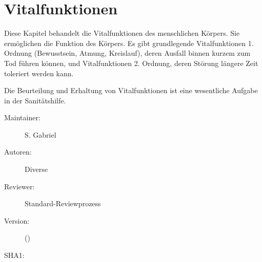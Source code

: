 % 
\def\ChapterCode{VIT}
\chapter
[\CO{[VIT]} Vitalfunktionen]
{Vitalfunktionen}
\label{chp:VIT}



% 
% 

\ChapterIntro
{Diese Kapitel behandelt die Vitalfunktionen
des menschlichen Körpers. Sie ermöglichen die Funktion des
Körpers. Es gibt grundlegende Vitalfunktionen 1. Ordnung
(Bewusstsein, Atmung, Kreislauf), deren Ausfall binnen
kurzem zum Tod führen können, und Vitalfunktionen 2.
Ordnung, deren
Störung längere Zeit toleriert werden kann.

Die Beurteilung und Erhaltung von Vitalfunktionen ist eine
wesentliche Aufgabe in der Sanitätshilfe.
}{%
\begin{description}
  \item[Maintainer:] S. Gabriel
  \item[Autoren:] Diverse
  \item[Reviewer:] Standard-Reviewprozess
  \item[Version:] {\DocVersion} ({\DocVersionInfo})
  \item[SHA1:] {\DocGitCommit}
\end{description}

{\TxTeilkapitelAASS}
}



